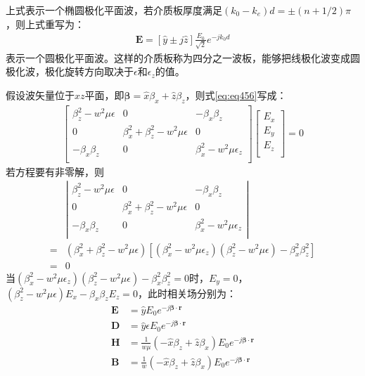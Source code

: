 \documentclass{article}
\numberwithin{equation}{section}
\renewcommand{\vec}[1]{\boldsymbol{#1}}
\begin{document}
上式表示一个椭圆极化平面波，若介质板厚度满足$(k_0-k_e)d=\pm(n+1/2)\pi$，则上式重写为：
\begin{align}
    \label{eq:eq470}
    \mathbf{E}=[\hat{y}\pm j\hat{z}]\frac{E_0}{\sqrt{2}}e^{-jk_0d}
\end{align}
表示一个圆极化平面波。这样的介质板称为四分之一波板，能够把线极化波变成圆极化波，极化旋转方向取决于$\epsilon$和$\epsilon_z$的值。\par
假设波矢量位于$xz$平面，即$\vec{\beta}=\hat{x}\beta_x+\hat{z}\beta_z$，则式\ref{eq:eq456}写成：
\begin{align}
    \label{eq:eq471}
    \left[
        \begin{matrix}
            \beta_z^2-w^2\mu\epsilon & 0 & -\beta_x\beta_z \\
            0 & \beta_x^2+\beta_z^2-w^2\mu\epsilon & 0 \\
            -\beta_x\beta_z & 0 & \beta_x^2-w^2\mu\epsilon_z \\
        \end{matrix}
    \right]
    \left[
        \begin{matrix}
            E_x \\
            E_y \\
            E_z \\
        \end{matrix}
    \right]=0
\end{align}
若方程要有非零解，则
\begin{align}
    \label{eq:eq472}
    &\left|
        \begin{matrix}
            \beta_z^2-w^2\mu\epsilon & 0 & -\beta_x\beta_z \\
            0 & \beta_x^2+\beta_z^2-w^2\mu\epsilon & 0 \\
            -\beta_x\beta_z & 0 & \beta_x^2-w^2\mu\epsilon_z \\
        \end{matrix}
    \right| \\
    =&(\beta_x^2+\beta_z^2-w^2\mu\epsilon)[(\beta_x^2-w^2\mu\epsilon_z)(\beta_z^2-w^2\mu\epsilon)-\beta_x^2\beta_z^2] \\
    =&0
\end{align}
当$(\beta_x^2-w^2\mu\epsilon_z)(\beta_z^2-w^2\mu\epsilon)-\beta_x^2\beta_z^2=0$时，$E_y=0$，$(\beta_z^2-w^2\mu\epsilon)E_x-\beta_x\beta_zE_z=0$，此时相关场分别为：
\begin{align}
    \label{eq:eq473}
    \mathbf{E}&=\hat{y}E_0e^{-j\vec{\beta}\cdot\vec{r}} \\
    \label{eq:eq474}
    \mathbf{D}&=\hat{y}\epsilon E_0e^{-j\vec{\beta}\cdot\vec{r}} \\
    \label{eq:eq475}
    \mathbf{H}&=\frac{1}{w\mu}(-\hat{x}\beta_z+\hat{z}\beta_x)E_0e^{-j\vec{\beta}\cdot\vec{r}} \\
    \label{eq:eq476}
    \mathbf{B}&=\frac{1}{w}(-\hat{x}\beta_z+\hat{z}\beta_x)E_0e^{-j\vec{\beta}\cdot\vec{r}}
\end{align}
\end{document}
